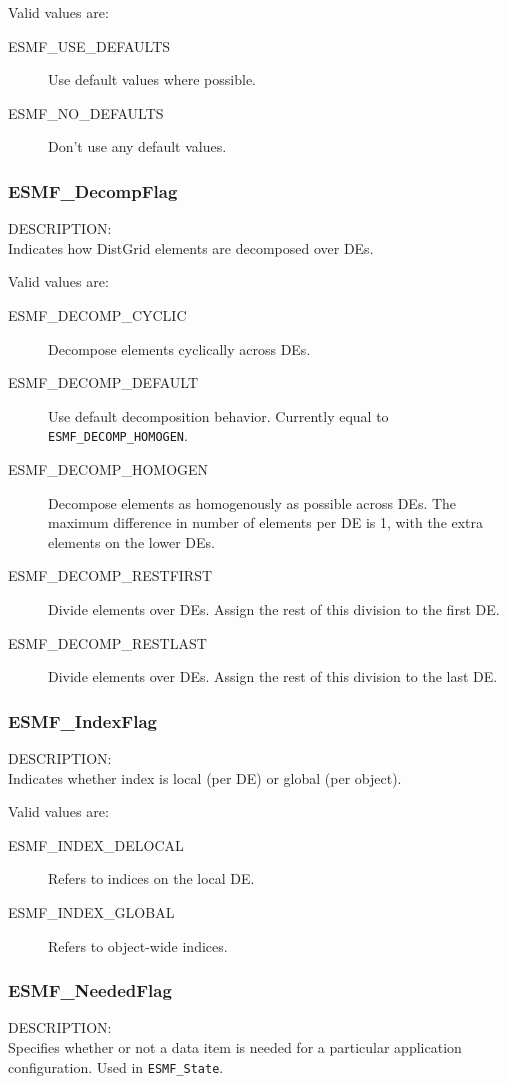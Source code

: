 Valid values are:
\begin{description}
\item [ESMF\_USE\_DEFAULTS]
      Use default values where possible.
\item [ESMF\_NO\_DEFAULTS]
      Don't use any default values.
\end{description}

\subsubsection{ESMF\_DecompFlag}
\label{opt:decompflag}
{\sf DESCRIPTION:\\}
Indicates how DistGrid elements are decomposed over DEs.

Valid values are:
\begin{description}
\item [ESMF\_DECOMP\_CYCLIC]
      Decompose elements cyclically across DEs.
\item [ESMF\_DECOMP\_DEFAULT]
      Use default decomposition behavior. Currently equal to 
      {\tt ESMF\_DECOMP\_HOMOGEN}.
\item [ESMF\_DECOMP\_HOMOGEN]
      Decompose elements as homogenously as possible across DEs. The maximum 
      difference in number of elements per DE is 1, with the extra elements on
      the lower DEs.
\item [ESMF\_DECOMP\_RESTFIRST]
      Divide elements over DEs. Assign the rest of this division to the first
      DE.
\item [ESMF\_DECOMP\_RESTLAST]
      Divide elements over DEs. Assign the rest of this division to the last DE.
\end{description}

\subsubsection{ESMF\_IndexFlag}
\label{opt:indexflag}
{\sf DESCRIPTION:\\}
Indicates whether index is local (per DE) or global (per object).

Valid values are:
\begin{description}
\item [ESMF\_INDEX\_DELOCAL]
      Refers to indices on the local DE.
\item [ESMF\_INDEX\_GLOBAL]
      Refers to object-wide indices.
\end{description}

\subsubsection{ESMF\_NeededFlag}
\label{opt:neededflag}
{\sf DESCRIPTION:\\}
Specifies whether or not a data item is needed for a 
particular application configuration.  Used in {\tt ESMF\_State}.

